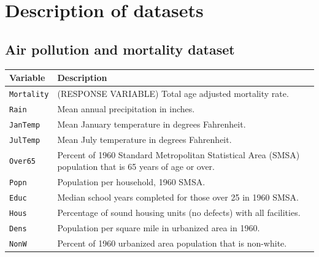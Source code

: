 \vspace{-3mm}
\section{Description of datasets}
\vspace{-2mm}

\subsection{Air pollution and mortality dataset}
\label{apx:airpollution}
\vspace{-1mm}

\begin{table}[H]
\centering
\begin{tabular}{p{2.1cm}p{11.5cm}}
\textbf{Variable}     & \textbf{Description}                                                                                              \\
\hline
\texttt{Mortality}    & (RESPONSE VARIABLE) Total age adjusted mortality rate.                                                    \\
\texttt{Rain}         & Mean annual precipitation in inches.                                                                      \\
\texttt{JanTemp}      & Mean January temperature in degrees Fahrenheit.                                                           \\
\texttt{JulTemp}      & Mean July temperature in degrees Fahrenheit.                                                              \\
\texttt{Over65}       & Percent of 1960 Standard Metropolitan Statistical Area (SMSA) population that is 65 years of age or over. \\
\texttt{Popn}         & Population per household, 1960 SMSA.                                                                      \\
\texttt{Educ}         & Median school years completed for those over 25 in 1960 SMSA.                                             \\
\texttt{Hous}         & Percentage of sound housing units (no defects) with all facilities.                                       \\
\texttt{Dens}         & Population per square mile in urbanized area in 1960.                                                     \\
\texttt{NonW}         & Percent of 1960 urbanized area population that is non-white.                                              \\

\end{tabular}
\end{table}
